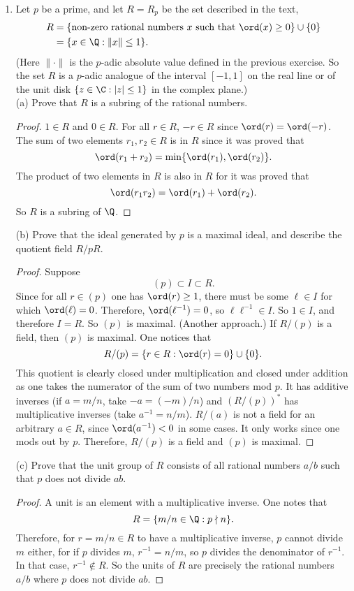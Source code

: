 \documentclass[11pt, oneside]{article}
\begin{document}
\begin{enumerate}
\item Let $p$ be a prime, and let $R=R_p$ be the set described in the text, 
\begin{align*}
R &= \{\textrm{non-zero rational numbers $x$ such that } \ord(x)\ge  0\}\cup \{0\}\\
&= \{x\in\Q : \|x\| \le  1\}.
\end{align*}
(Here $\|\cdot\|$ is the $p$-adic absolute value defined in the previous exercise. So the set $R$ is a $p$-adic analogue of the interval $[-1,1]$ on the real line or of the unit disk $\{z\in\C : |z| \le  1\}$ in the complex plane.)\\
(a) Prove that $R$ is a subring of the rational numbers.
\begin{proof}
$1\in R$ and $0\in R$. For all $r\in R$, $-r \in R$ since $\ord(r) = \ord(-r)$. The sum of two elements $r_1, r_2\in R$ is in $R$ since it was proved that
$$
\ord(r_1+r_2) = \min\{\ord(r_1), \ord(r_2)\}.
$$ 
The product of two elements in $R$ is also in $R$ for it was proved that
$$
\ord(r_1r_2) = \ord(r_1) + \ord(r_2).
$$
So $R$ is a subring of $\Q$. %
\end{proof}
(b) Prove that the ideal generated by $p$ is a maximal ideal, and describe the quotient field $R/pR$.
\begin{proof}
Suppose 
$$
(p) \subset I \subset R.
$$
Since for all $r \in (p)$ one has $\ord(r) \ge  1$, there must be some $\ell\in I$ for which $\ord(\ell) = 0$. Therefore, $\ord(\ell^{-1}) = 0$, so $\ell \ell^{-1}\in I$. So $1\in I$, and therefore $I=R$. So $(p)$ is maximal. (Another approach.) If $R/(p)$ is a field, then $(p)$ is maximal. One notices that
$$
R/(p) = \{ r\in R : \ord(r)=0\} \cup \{0\}.
$$
This quotient is clearly closed under multiplication and closed under addition as one takes the numerator of the sum of two numbers mod $p$. It has additive inverses (if $a = m/n$, take $-a = (-m)/n$) and $(R/(p))^*$ has multiplicative inverses (take $a^{-1} = n/m$). $R/(a)$ is not a field for an arbitrary $a\in R$, since $\ord(a^{-1}) < 0$ in some cases. It only works since one mods out by $p$. Therefore, $R/(p)$ is a field and $(p)$ is maximal. %
\end{proof}
(c) Prove that the unit group of $R$ consists of all rational numbers $a/b$ such that $p$ does not divide $ab$.
\begin{proof}
A unit is an element with a multiplicative inverse. One notes that
$$
R = \{  m/n\in \Q : p \nmid n \}.
$$
Therefore, for $r = m/n\in R$ to have a multiplicative inverse, $p$ cannot divide $m$ either, for if $p$ divides $m$, $r^{-1} = n/m$, so $p$ divides the denominator of $r^{-1}$. In that case, $r^{-1}\notin R$. So the units of $R$ are precisely the rational numbers $a/b$ where $p$ does not divide $ab$.

\end{proof}
\end{enumerate}
\end{document}
